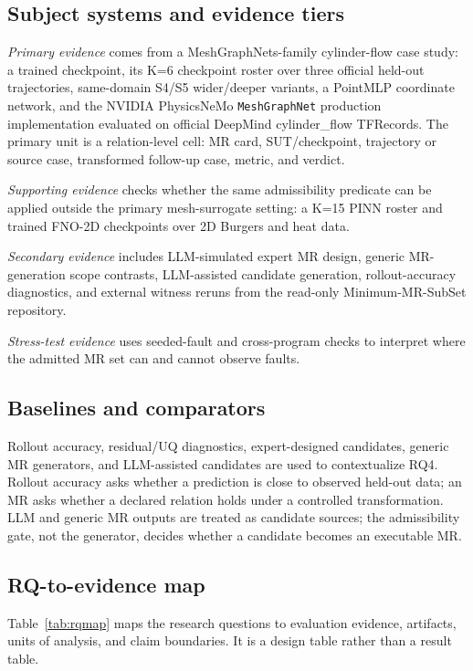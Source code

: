 \documentclass[preprint,12pt]{elsarticle}
\begin{document}
\subsection{Subject systems and evidence tiers}
\label{subsec:suts}

\emph{Primary evidence} comes from a MeshGraphNets-family cylinder-flow case study: a trained checkpoint, its K=6 checkpoint roster over three official held-out trajectories, same-domain S4/S5 wider/deeper variants, a PointMLP coordinate network, and the NVIDIA PhysicsNeMo \texttt{MeshGraphNet} production implementation evaluated on official DeepMind cylinder\_flow TFRecords. The primary unit is a relation-level cell: MR card, SUT/checkpoint, trajectory or source case, transformed follow-up case, metric, and verdict.

\emph{Supporting evidence} checks whether the same admissibility predicate can be applied outside the primary mesh-surrogate setting: a K=15 PINN roster and trained FNO-2D checkpoints over 2D Burgers and heat data.

\emph{Secondary evidence} includes LLM-simulated expert MR design, generic MR-generation scope contrasts, LLM-assisted candidate generation, rollout-accuracy diagnostics, and external witness reruns from the read-only Minimum-MR-SubSet repository.

\emph{Stress-test evidence} uses seeded-fault and cross-program checks to interpret where the admitted MR set can and cannot observe faults.

\subsection{Baselines and comparators}
\label{subsec:baselines}

Rollout accuracy, residual/UQ diagnostics, expert-designed candidates, generic MR generators, and LLM-assisted candidates are used to contextualize RQ4. Rollout accuracy asks whether a prediction is close to observed held-out data; an MR asks whether a declared relation holds under a controlled transformation. LLM and generic MR outputs are treated as candidate sources; the admissibility gate, not the generator, decides whether a candidate becomes an executable MR.

\subsection{RQ-to-evidence map}
\label{subsec:rq-evidence}

Table~\ref{tab:rqmap} maps the research questions to evaluation evidence, artifacts, units of analysis, and claim boundaries. It is a design table rather than a result table.
\end{document}
